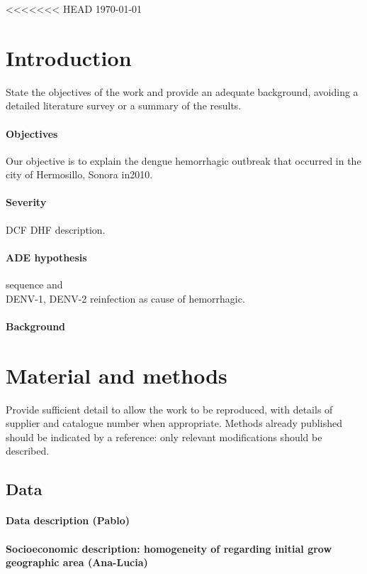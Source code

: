 \documentclass{imammb}
\numberwithin{equation}{section}
\begin{document}
<<<<<<< HEAD
     \today
     \section{Introduction} \label{intro}
         State the objectives of the work and provide an adequate 
         background, avoiding a detailed literature survey or a 
         summary of the results.
         \paragraph{Objectives}
         Our objective is to explain the dengue hemorrhagic outbreak that 
      occurred in the city of Hermosillo, Sonora in2010.
     \paragraph{Severity}
     \ac{DCF} 
     \ac{DHF} description.
     \paragraph{ADE hypothesis}
      sequence and
      \\
      \ac{DENV-1}, \ac{DENV-2}
      reinfection as cause of hemorrhagic.
         \paragraph{Background}
       
     \section{Material and methods}
         Provide sufficient detail to allow the work to be 
         reproduced, with details of supplier and catalogue 
         number when appropriate. Methods already published 
         should be indicated by a reference: only relevant 
         modifications should be described.
         \subsection{Data}
             \paragraph{Data description (Pablo)}
             \paragraph{Socioeconomic description: 
                 homogeneity of regarding initial
                 grow geographic area (Ana-Lucia)}
\end{document}
